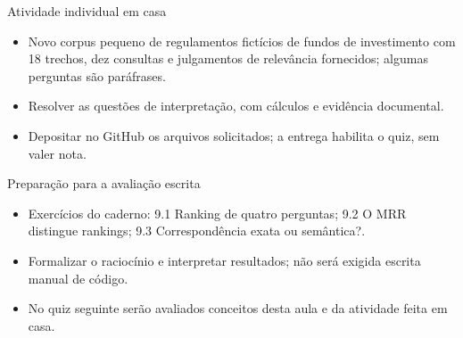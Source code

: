 \documentclass[10pt,aspectratio=169]{beamer}
\begin{document}
\begin{frame}[t]{Atividade individual em casa}
\small
\begin{itemize}
\item Novo corpus pequeno de regulamentos fictícios de fundos de investimento com 18 trechos, dez consultas e julgamentos de relevância fornecidos; algumas perguntas são paráfrases.
\item Resolver as questões de interpretação, com cálculos e evidência documental.
\item Depositar no GitHub os arquivos solicitados; a entrega habilita o quiz, sem valer nota.
\end{itemize}
\end{frame}

\begin{frame}[t]{Preparação para a avaliação escrita}
\small
\begin{itemize}
\item Exercícios do caderno: 9.1 Ranking de quatro perguntas; 9.2 O MRR distingue rankings; 9.3 Correspondência exata ou semântica?.
\item Formalizar o raciocínio e interpretar resultados; não será exigida escrita manual de código.
\item No quiz seguinte serão avaliados conceitos desta aula e da atividade feita em casa.
\end{itemize}
\end{frame}
\end{document}
